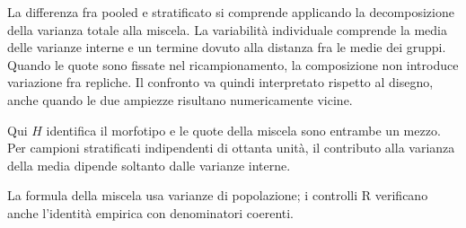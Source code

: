 \documentclass[12pt,aspectratio=1610]{beamer}
\begin{document}
\begin{lrbox}{\BodyBox}\begin{minipage}[t]{10.25cm}\raggedright\sloppy\color{Ink}\fontsize{12.4}{16.4}\selectfont La differenza fra pooled e stratificato si comprende applicando la decomposizione della varianza totale alla miscela. La variabilità individuale comprende la media delle varianze interne e un termine dovuto alla distanza fra le medie dei gruppi. Quando le quote sono fissate nel ricampionamento, la composizione non introduce variazione fra repliche. Il confronto va quindi interpretato rispetto al disegno, anche quando le due ampiezze risultano numericamente vicine.\par{}\end{minipage}\end{lrbox}
\begin{lrbox}{\SideBox}\begin{minipage}[t]{7.45cm}\raggedright\sloppy\color{Ink}\fontsize{12.2}{16.1}\selectfont Qui $H$ identifica il morfotipo e le quote della miscela sono entrambe un mezzo. Per campioni stratificati indipendenti di ottanta unità, il contributo alla varianza della media dipende soltanto dalle varianze interne.\par{}\end{minipage}\end{lrbox}
\begin{lrbox}{\RecallBox}\begin{minipage}[t]{16.45cm}\raggedright\sloppy\color{Ink}\fontsize{10.1}{13.2}\selectfont La formula della miscela usa varianze di popolazione; i controlli R verificano anche l’identità empirica con denominatori coerenti.\end{minipage}\end{lrbox}
\end{document}
